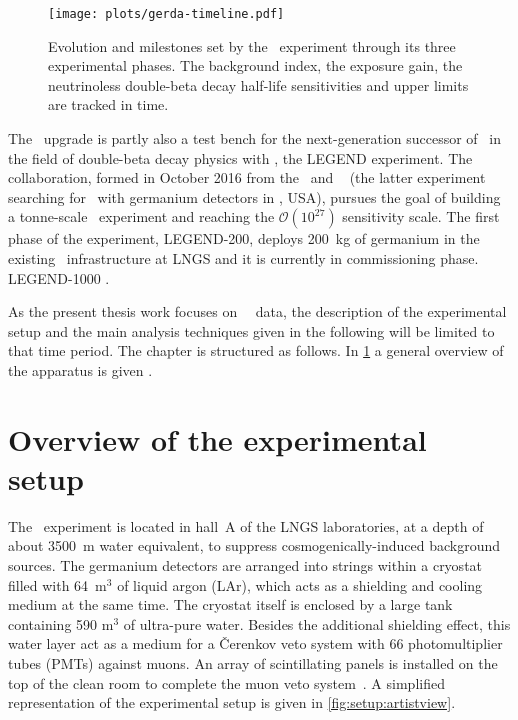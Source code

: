 \begin{figure}
  \centering
  \texttt{[image: plots/gerda-timeline.pdf]}
  \caption{%
    Evolution and milestones set by the \gerda\ experiment through its three experimental
    phases. The background index, the exposure gain, the neutrinoless double-beta decay
    half-life sensitivities and upper limits are tracked in time.
  }
\end{figure}

The \phasetwop\ upgrade is partly also a test bench for the next-generation successor of
\gerda\ in the field of double-beta decay physics with \gesix, the LEGEND experiment. The
collaboration, formed in October 2016 from the \gerda\ and \majorana~\cite{Abgrall2014}
(the latter experiment searching for \onbb\ with germanium detectors in \fillme, USA),
pursues the goal of building a tonne-scale \gesix\ experiment and reaching the
$\mathcal{O}(10^{27})$ sensitivity scale. The first phase of the experiment, LEGEND-200,
deploys 200~kg of germanium in the existing \gerda\ infrastructure at LNGS and it is
currently in commissioning phase. LEGEND-1000 \fillme.

As the present thesis work focuses on \gerda\ \phasetwo\ data, the description of the
experimental setup and the main analysis techniques given in the following will be limited
to that time period. The chapter is structured as follows. In
\cref{sec:gerda:setup} a general overview of the apparatus is given \fillme.

\section{Overview of the experimental setup}\label{sec:gerda:setup}

The \gerda\ experiment is located in hall~A of the LNGS laboratories, at a depth of about
3500~m water equivalent, to suppress cosmogenically-induced background sources. The
germanium detectors are arranged into strings within a cryostat filled with 64~m$^3$ of
liquid argon (LAr), which acts as a shielding and cooling medium at the same time. The
cryostat itself is enclosed by a large tank containing 590 m$^3$ of ultra-pure water.
Besides the additional shielding effect, this water layer act as a medium for a
\v{C}erenkov veto system with 66 photomultiplier tubes (PMTs) against muons. An array of
scintillating panels is installed on the top of the clean room to complete the muon veto
system~\cite{Freund2016}. A simplified representation of the experimental setup is given
in \cref{fig:setup:artistview}.

